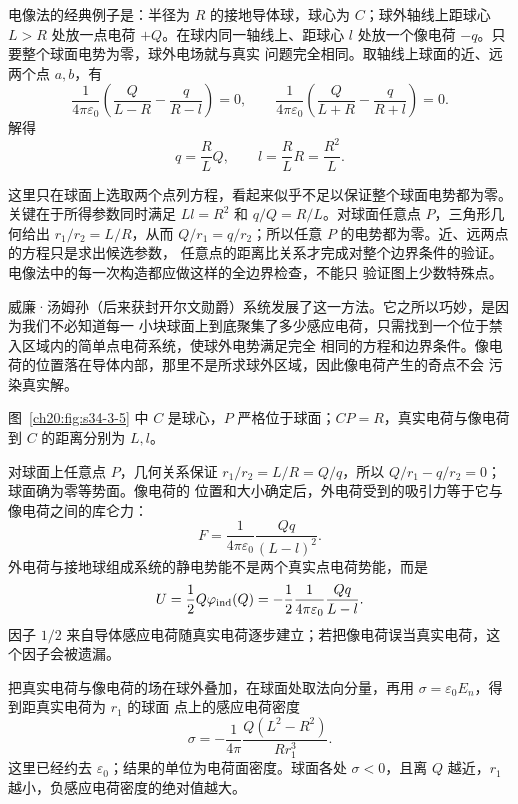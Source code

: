 {电像法的经典例子是：半径为 $R$ 的接地导体球，球心为 $C$；球外轴线上距球心 $L>R$ 处放一点电荷
$+Q$。在球内同一轴线上、距球心 $l$ 处放一个像电荷 $-q$。只要整个球面电势为零，球外电场就与真实
问题完全相同。取轴线上球面的近、远两个点 $a,b$，有
\[
  \frac{1}{4\pi\varepsilon_0}
  \left(\frac{Q}{L-R}-\frac{q}{R-l}\right)=0,
  \qquad
  \frac{1}{4\pi\varepsilon_0}
  \left(\frac{Q}{L+R}-\frac{q}{R+l}\right)=0.
\]
解得
\begin{equation}
  \boxed{q=\frac RLQ,\qquad l=\frac RL R=\frac{R^2}{L}}.
\end{equation}

这里只在球面上选取两个点列方程，看起来似乎不足以保证整个球面电势都为零。关键在于所得参数同时满足
$Ll=R^2$ 和 $q/Q=R/L$。对球面任意点 $P$，三角形几何给出
$r_1/r_2=L/R$，从而 $Q/r_1=q/r_2$；所以任意 $P$ 的电势都为零。近、远两点的方程只是求出候选参数，
任意点的距离比关系才完成对整个边界条件的验证。电像法中的每一次构造都应做这样的全边界检查，不能只
验证图上少数特殊点。

威廉·汤姆孙（后来获封开尔文勋爵）系统发展了这一方法。它之所以巧妙，是因为我们不必知道每一
小块球面上到底聚集了多少感应电荷，只需找到一个位于禁入区域内的简单点电荷系统，使球外电势满足完全
相同的方程和边界条件。像电荷的位置落在导体内部，那里不是所求球外区域，因此像电荷产生的奇点不会
污染真实解。

图~\ref{ch20:fig:s34-3-5} 中 $C$ 是球心，$P$ 严格位于球面；$CP=R$，真实电荷与像电荷到 $C$ 的距离分别为 $L,l$。

\par\noindent\begin{minipage}{\linewidth}
\groundedSphereImageFigure
{}\label{ch20:fig:s34-3-5}
\end{minipage}\par\medskip

对球面上任意点 $P$，几何关系保证
$r_1/r_2=L/R=Q/q$，所以 $Q/r_1-q/r_2=0$；球面确为零等势面。像电荷的
位置和大小确定后，外电荷受到的吸引力等于它与像电荷之间的库仑力：
\[
  F=\frac{1}{4\pi\varepsilon_0}\frac{Qq}{(L-l)^2}.
\]
外电荷与接地球组成系统的静电势能不是两个真实点电荷势能，而是
\[
  U=\frac12Q\varphi_{\rm ind}(Q)
  =-\frac12\frac{1}{4\pi\varepsilon_0}\frac{Qq}{L-l}.
\]
因子 $1/2$ 来自导体感应电荷随真实电荷逐步建立；若把像电荷误当真实电荷，这个因子会被遗漏。

把真实电荷与像电荷的场在球外叠加，在球面处取法向分量，再用 $\sigma=\varepsilon_0 E_n$，得到距真实电荷为 $r_1$ 的球面
点上的感应电荷密度
\begin{equation}
  \boxed{\sigma=-\frac{1}{4\pi}\frac{Q(L^2-R^2)}{Rr_1^3}}.
\end{equation}
这里已经约去 $\varepsilon_0$；结果的单位为电荷面密度。球面各处 $\sigma<0$，且离 $Q$ 越近，$r_1$
越小，负感应电荷密度的绝对值越大。


}
